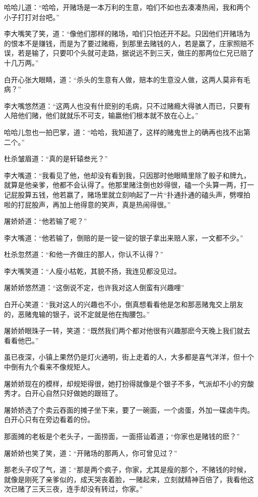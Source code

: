 \documentclass[12pt,oneside]{book}
\begin{document}
哈哈儿道：``哈哈，开赌场是一本万利的生意，咱们不如也去凑凑热闹，我和两个小子打打对台吧。''

李大嘴笑了笑，道：``像他们那样的赌场，咱们只怕还开不起。只因他们开赌场为的恨本不是赚钱，而是为了要过赌瘾，到那里去赌钱的人，若是赢了，庄家照赔不误，若是输了，只要叩个头就可走路，据说远不到三天，做庄的那两位仁兄已赔了十几万两。''

白开心张大眼睛，道：``杀头的生意有人做，赔本的生意没人做，这两人莫非有毛病？''

李大嘴悠然道：``这两人也没有什麽别的毛病，只不过赌瘾大得骇人而已，只要有人陪他们赌，他们就就乐不可支，输嬴他们根本就不放在心上。''

哈哈儿忽也一拍巴掌，道：``哈哈，我知道了，这样的赌鬼世上的确再也找不出第二个。''

杜杀皱眉道：``真的是轩辕叁光？''

李大嘴道：``我看见了他，他却没有看到我，只因那时他眼睛里除了骰子和牌九，就算是他亲爹，他都不会认得了。他那里赌注倒也妙得很，磕一个头算一两，打一记屁股算五钱，他若嬴了，赌场里就立刻响起了一片``扑通扑通的磕头声，劈哩拍啦的打屁股声，再加上他得意的笑声，真是热闹得很。''

屠娇娇道：``他若输了呢？''

李大嘴道：``他若输了，倒赔的是一锭一锭的银子拿出来赔人家，一文都不少。''

杜杀忽然道：``和他一齐做庄的那人，你认不认得？''

李大嘴笑道：``人瘦小枯乾，其貌不扬，我连见都没见过。

屠娇娇悠然道：``这倒说不定，也许我对这人倒蛮有兴趣哩''

白开心笑道：``我对这人的兴趣也不小，倒真想看看他是怎和那恶赌鬼交上朋友的，恶赌鬼输的银子，说不定就是他在掏腰包。''

屠娇娇眼珠子一转，笑道：``既然我们两个都对他很有兴趣那麽今天晚上我们就去看看他巴。''

虽已夜深，小镇上果然仍是灯火通明，街上走着的人，大多都是喜气洋洋，但十个中倒有九个看来不像规矩人。

屠娇娇现在的模样，却规矩得很，她打扮得就像是个银子不多，气派却不小的穷酸秀才。白开心自然只好做她的跟班了。

屠娇娇选了个卖云吞面的摊子坐下来，要了一碗面，一个卤蛋，外加一碟卤牛肉。白开心只有在旁边看着的份。

那面摊的老板是个老头子，一面捞面，一面搭讪着道；``你家也是赌钱的麽？''

屠娇娇也笑了笑，道：``开赌场的那两人，你可曾见过？''

那老头子叹了气，道：``那是两个疯子，你家，尤其是瘦的那个，不赌钱的时候，就像是刚死了亲爹似的，成天哭丧着脸，一赌起来，立刻就精神百倍了，我看他这次已赌了三天三夜，连手却没有转过，你家。''
\end{document}
